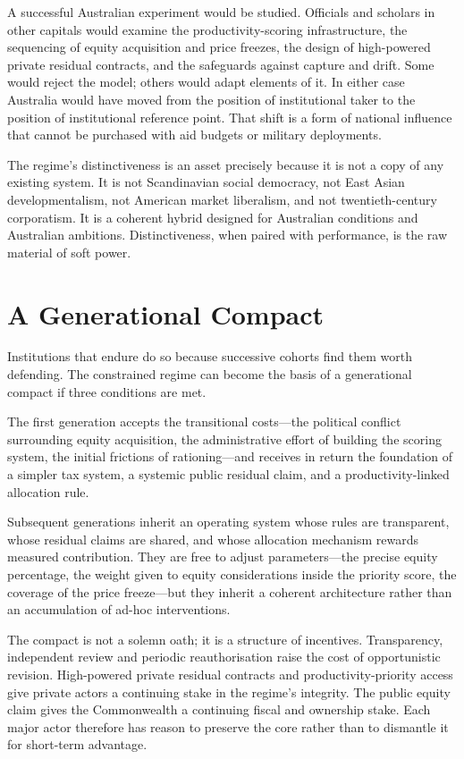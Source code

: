 \documentclass[12pt,anyside]{book}
\theoremstyle{definition}
\theoremstyle{plain}
\theoremstyle{remark}
\begin{document}
A successful Australian experiment would be studied. Officials and scholars in other capitals would examine the productivity-scoring infrastructure, the sequencing of equity acquisition and price freezes, the design of high-powered private residual contracts, and the safeguards against capture and drift. Some would reject the model; others would adapt elements of it. In either case Australia would have moved from the position of institutional taker to the position of institutional reference point. That shift is a form of national influence that cannot be purchased with aid budgets or military deployments.

The regime’s distinctiveness is an asset precisely because it is not a copy of any existing system. It is not Scandinavian social democracy, not East Asian developmentalism, not American market liberalism, and not twentieth-century corporatism. It is a coherent hybrid designed for Australian conditions and Australian ambitions. Distinctiveness, when paired with performance, is the raw material of soft power.

\section{A Generational Compact}

Institutions that endure do so because successive cohorts find them worth defending. The constrained regime can become the basis of a generational compact if three conditions are met.

The first generation accepts the transitional costs—the political conflict surrounding equity acquisition, the administrative effort of building the scoring system, the initial frictions of rationing—and receives in return the foundation of a simpler tax system, a systemic public residual claim, and a productivity-linked allocation rule.

Subsequent generations inherit an operating system whose rules are transparent, whose residual claims are shared, and whose allocation mechanism rewards measured contribution. They are free to adjust parameters—the precise equity percentage, the weight given to equity considerations inside the priority score, the coverage of the price freeze—but they inherit a coherent architecture rather than an accumulation of ad-hoc interventions.

The compact is not a solemn oath; it is a structure of incentives. Transparency, independent review and periodic reauthorisation raise the cost of opportunistic revision. High-powered private residual contracts and productivity-priority access give private actors a continuing stake in the regime’s integrity. The public equity claim gives the Commonwealth a continuing fiscal and ownership stake. Each major actor therefore has reason to preserve the core rather than to dismantle it for short-term advantage.
\end{document}
